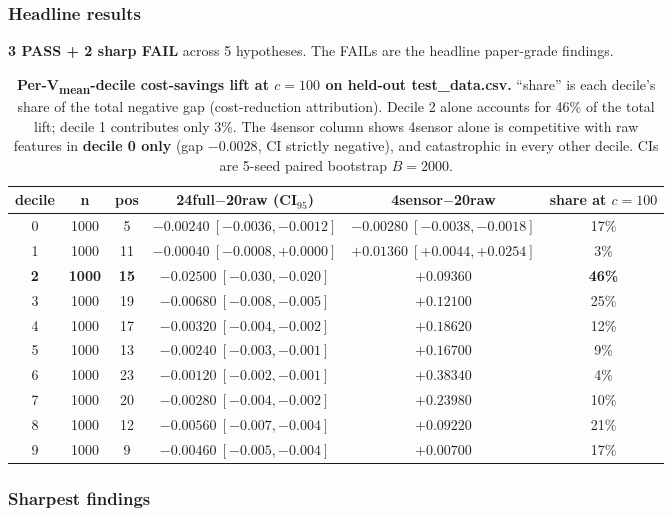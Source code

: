 \subsubsection{Headline results}\label{sec:p8-iter204-results}
\textbf{3 PASS + 2 sharp FAIL} across 5 hypotheses. The FAILs are the
headline paper-grade findings.

\begin{table}[h]
\centering
\small
\begin{tabular}{cccccc}
\hline
decile & n & pos & 24full$-$20raw (CI$_{95}$) & 4sensor$-$20raw & share at $c{=}100$ \\
\hline
0 & 1000 &  5 & $-0.00240\ [-0.0036,-0.0012]$ & $\mathbf{-0.00280\ [-0.0038,-0.0018]}$ &  17\% \\
1 & 1000 & 11 & $-0.00040\ [-0.0008,+0.0000]$ & $+0.01360\ [+0.0044,+0.0254]$ &   3\% \\
\textbf{2} & \textbf{1000} & \textbf{15} & $\mathbf{-0.02500\ [-0.030,-0.020]}$ & $+0.09360$ & \textbf{46\%} \\
3 & 1000 & 19 & $-0.00680\ [-0.008,-0.005]$ & $+0.12100$ & 25\% \\
4 & 1000 & 17 & $-0.00320\ [-0.004,-0.002]$ & $+0.18620$ & 12\% \\
5 & 1000 & 13 & $-0.00240\ [-0.003,-0.001]$ & $+0.16700$ &  9\% \\
6 & 1000 & 23 & $-0.00120\ [-0.002,-0.001]$ & $+0.38340$ &  4\% \\
7 & 1000 & 20 & $-0.00280\ [-0.004,-0.002]$ & $+0.23980$ & 10\% \\
8 & 1000 & 12 & $-0.00560\ [-0.007,-0.004]$ & $+0.09220$ & 21\% \\
9 & 1000 &  9 & $-0.00460\ [-0.005,-0.004]$ & $+0.00700$ & 17\% \\
\hline
\end{tabular}
\caption{\textbf{Per-V\textsubscript{mean}-decile cost-savings lift at
$c{=}100$ on held-out test\_data.csv.} ``share'' is each decile's share
of the total negative gap (cost-reduction attribution). Decile 2 alone
accounts for 46\% of the total lift; decile 1 contributes only 3\%. The
4sensor column shows 4sensor alone is competitive with raw features in
\textbf{decile 0 only} (gap $-0.0028$, CI strictly negative), and
catastrophic in every other decile. CIs are 5-seed paired bootstrap
$B{=}2000$.}
\label{tab:p8-iter204-decile-cost}
\end{table}

\subsubsection{Sharpest findings}\label{sec:p8-iter204-findings}

